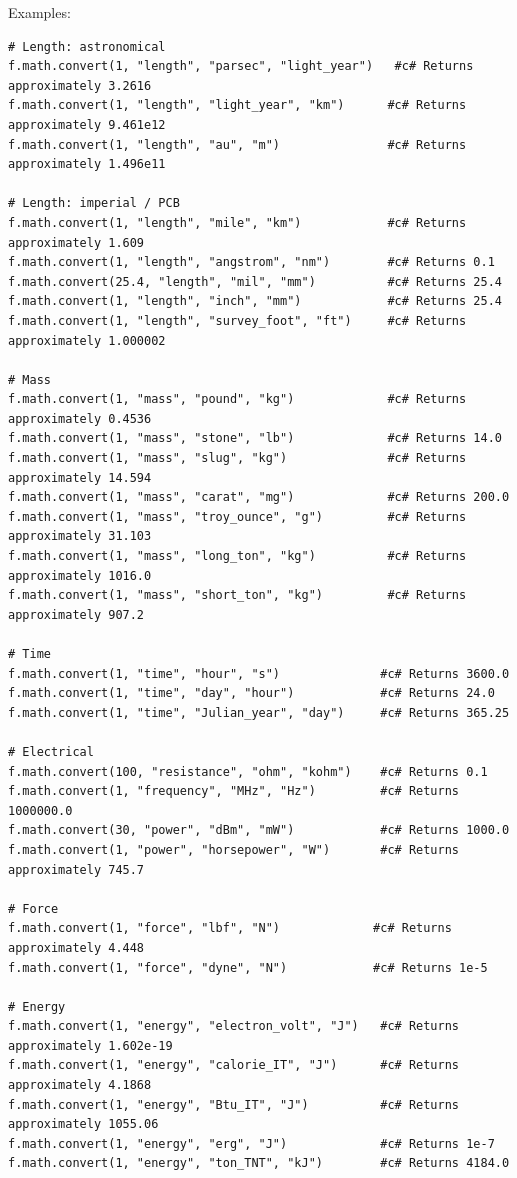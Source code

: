 Examples:
\begin{verbatim}
# Length: astronomical
f.math.convert(1, "length", "parsec", "light_year")   #c# Returns approximately 3.2616
f.math.convert(1, "length", "light_year", "km")      #c# Returns approximately 9.461e12
f.math.convert(1, "length", "au", "m")               #c# Returns approximately 1.496e11

# Length: imperial / PCB
f.math.convert(1, "length", "mile", "km")            #c# Returns approximately 1.609
f.math.convert(1, "length", "angstrom", "nm")        #c# Returns 0.1
f.math.convert(25.4, "length", "mil", "mm")          #c# Returns 25.4
f.math.convert(1, "length", "inch", "mm")            #c# Returns 25.4
f.math.convert(1, "length", "survey_foot", "ft")     #c# Returns approximately 1.000002

# Mass
f.math.convert(1, "mass", "pound", "kg")             #c# Returns approximately 0.4536
f.math.convert(1, "mass", "stone", "lb")             #c# Returns 14.0
f.math.convert(1, "mass", "slug", "kg")              #c# Returns approximately 14.594
f.math.convert(1, "mass", "carat", "mg")             #c# Returns 200.0
f.math.convert(1, "mass", "troy_ounce", "g")         #c# Returns approximately 31.103
f.math.convert(1, "mass", "long_ton", "kg")          #c# Returns approximately 1016.0
f.math.convert(1, "mass", "short_ton", "kg")         #c# Returns approximately 907.2

# Time
f.math.convert(1, "time", "hour", "s")              #c# Returns 3600.0
f.math.convert(1, "time", "day", "hour")            #c# Returns 24.0
f.math.convert(1, "time", "Julian_year", "day")     #c# Returns 365.25

# Electrical
f.math.convert(100, "resistance", "ohm", "kohm")    #c# Returns 0.1
f.math.convert(1, "frequency", "MHz", "Hz")         #c# Returns 1000000.0
f.math.convert(30, "power", "dBm", "mW")            #c# Returns 1000.0
f.math.convert(1, "power", "horsepower", "W")       #c# Returns approximately 745.7

# Force
f.math.convert(1, "force", "lbf", "N")             #c# Returns approximately 4.448
f.math.convert(1, "force", "dyne", "N")            #c# Returns 1e-5

# Energy
f.math.convert(1, "energy", "electron_volt", "J")   #c# Returns approximately 1.602e-19
f.math.convert(1, "energy", "calorie_IT", "J")      #c# Returns approximately 4.1868
f.math.convert(1, "energy", "Btu_IT", "J")          #c# Returns approximately 1055.06
f.math.convert(1, "energy", "erg", "J")             #c# Returns 1e-7
f.math.convert(1, "energy", "ton_TNT", "kJ")        #c# Returns 4184.0


\end{verbatim}
